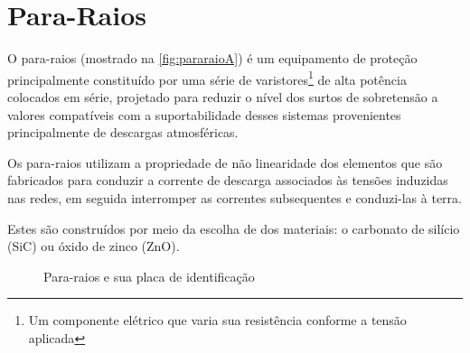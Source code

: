 \documentclass[a5paper,english,spanish,brazil]{ufsc-thesis}
\begin{document}
	\section{Para-Raios}
		O para-raios (mostrado na \autoref{fig:pararaioA}) é um equipamento de proteção principalmente constituído por uma série de varistores\footnote{Um componente elétrico que varia sua resistência conforme a tensão aplicada\cite[p. 413]{BellSytemHistory}} de alta potência colocados em série, projetado para reduzir o nível dos surtos de sobretensão a valores compatíveis com a suportabilidade desses sistemas provenientes principalmente de descargas atmosféricas.\par
		Os para-raios utilizam a propriedade de não linearidade dos elementos que são fabricados para conduzir a corrente de descarga associados às tensões induzidas nas redes, em seguida interromper as correntes subsequentes e conduzi-las à terra.\par
		Estes são construídos por meio da escolha de dos materiais: o carbonato de silício (SiC) ou óxido de zinco (ZnO). 

		\begin{figure}[htb]
			\caption{Para-raios e sua placa de identificação}
			\centering
		\end{figure}
\end{document}

